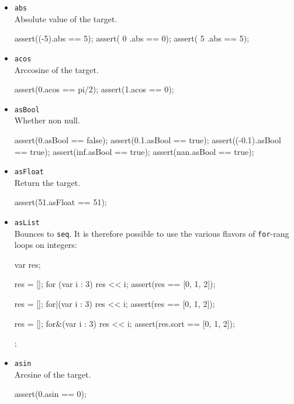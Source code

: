 \begin{itemize}
\item \lstinline|abs|\\
  Absolute value of the target.
\begin{urbiscript}[firstnumber=last]
assert((-5).abs == 5);
assert(  0 .abs == 0);
assert(  5 .abs == 5);
\end{urbiscript}

\item \lstinline|acos|\\
  Arccosine of the target.
\begin{urbiscript}[firstnumber=last]
assert(0.acos == pi/2);
assert(1.acos == 0);
\end{urbiscript}

\item \lstinline|asBool|\\
  Whether non null.
\begin{urbiscript}[firstnumber=last]
assert(0.asBool == false);
assert(0.1.asBool == true);
assert((-0.1).asBool == true);
assert(inf.asBool == true);
assert(nan.asBool == true);
\end{urbiscript}

\item \lstinline|asFloat|\\
  Return the target.
\begin{urbiscript}[firstnumber=last]
assert(51.asFloat == 51);
\end{urbiscript}

\item \lstinline|asList|\\
  Bounces to \lstinline|seq|.  It is therefore possible to use the
  various flavors of \lstinline|for|-rang loops on integers:
\begin{urbiscript}[firstnumber=last]
{
  var res;

  res = [];
  for (var i : 3)
    res << i;
  assert(res == [0, 1, 2]);

  res = [];
  for|(var i : 3)
    res << i;
  assert(res == [0, 1, 2]);

  res = [];
  for&(var i : 3)
    res << i;
  assert(res.sort == [0, 1, 2]);
};
\end{urbiscript}%

\item \lstinline|asin|\\
  Arcsine of the target.
\begin{urbiscript}[firstnumber=last]
assert(0.asin == 0);
\end{urbiscript}


\end{itemize}
